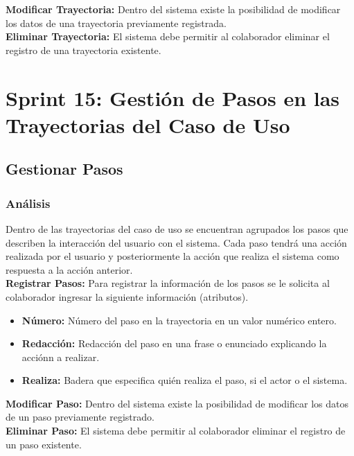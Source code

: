 \textbf {Modificar Trayectoria:}
Dentro del sistema existe la posibilidad de modificar los datos de una trayectoria previamente registrada.\\

\textbf {Eliminar Trayectoria:} 
El sistema debe permitir al colaborador eliminar el registro de una trayectoria existente.\\

\section{Sprint 15: Gestión de Pasos en las Trayectorias del Caso de Uso}

\subsection{Gestionar Pasos}
\subsubsection {Análisis}
Dentro de las trayectorias del caso de uso se encuentran agrupados los pasos que describen la interacción del usuario con el sistema. Cada paso tendrá una acción realizada por el usuario y posteriormente la acción que realiza el sistema como respuesta a la acción anterior.\\

\textbf {Registrar Pasos:}
Para registrar la información de los pasos se le solicita al colaborador ingresar la siguiente información (atributos).
\begin{itemize}
	
	\item \textbf{Número:} Número del paso en la trayectoria en un valor numérico entero.
	\item \textbf{Redacción:} Redacción del paso en una frase o enunciado explicando la acciónn a realizar.
	\item \textbf{Realiza:} Badera que especifica quién realiza el paso, si el actor o el sistema.
	
\end{itemize}

\textbf {Modificar Paso:}
Dentro del sistema existe la posibilidad de modificar los datos de un paso previamente registrado.\\

\textbf {Eliminar Paso:} 
El sistema debe permitir al colaborador eliminar el registro de un paso existente.\\

